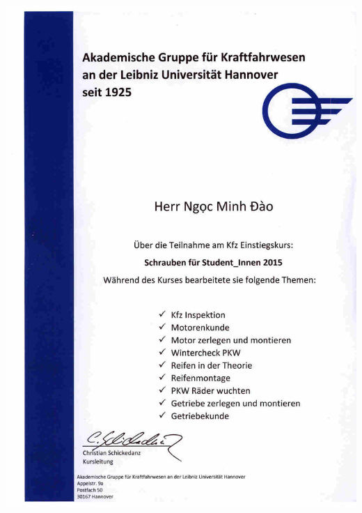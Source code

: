 \documentclass[12pt,a4paper]{scrartcl}
\begin{document}
\newpage
\includegraphics [width=\linewidth, height=\textheight] {./zeugnisse/akakraft_schrauben_kurs_lq.jpg}
\end{document}
